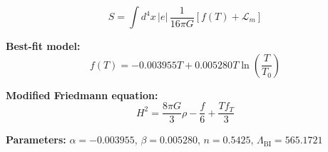 
\begin{equation}
  S = \int d^4x \, |e| \, \frac{1}{16\pi G} \left[ f(T) + \mathcal{L}_m \right]
\end{equation}

\textbf{Best-fit model:}
\begin{equation}
  f(T) = -0.003955 T + 0.005280 T \ln\!\left(\frac{T}{T_0}\right)
\end{equation}

\textbf{Modified Friedmann equation:}
\begin{equation}
  H^2 = \frac{8\pi G}{3} \rho - \frac{f}{6} + \frac{T f_T}{3}
\end{equation}

\textbf{Parameters:}
$\alpha = -0.003955$, \quad
$\beta = 0.005280$, \quad
$n = 0.5425$, \quad
$\Lambda_{\text{BI}} = 565.1721$